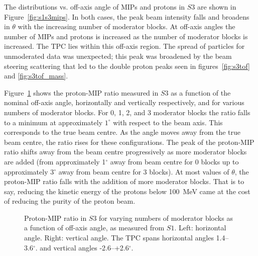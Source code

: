 The distributions vs. off-axis angle of MIPs and protons in $\mathit{S3}$ are shown in Figure~\ref{fig:s1s3mips}.
In both cases, the peak beam intensity falls and broadens in $\theta$ with the increasing number of moderator blocks. 
At off-axis angles the number of MIPs and protons is increased as the number of moderator blocks is increased.
The TPC lies within this off-axis region.
The spread of particles for unmoderated data was unexpected; this peak was broadened by the beam steering scattering that led to the double proton peaks seen in figures~\ref{fig:s3tof} and \ref{fig:s3tof_mass}.


Figure~\ref{fig:propiratio_s3_horz} shows the proton-MIP ratio measured in $\mathit{S3}$ as a function of the nominal off-axis angle, horizontally and vertically respectively, and for various numbers of moderator blocks.
For 0, 1, 2, and 3 moderator blocks the ratio falls to a minimum at approximately $1^{\circ}$ with respect to the beam axis.
This corresponds to the true beam centre.
As the angle moves away from the true beam centre, the ratio rises for these configurations.
The peak of the proton-MIP ratio shifts away from the beam centre progressively as more moderator blocks are added (from approximately 1$^{\circ}$ away from beam centre for 0 blocks up to approximately 3$^{\circ}$ away from beam centre for 3 blocks).
At most values of $\theta$, the proton-MIP ratio falls with the addition of more moderator blocks. 
That is to say, reducing the kinetic energy of the protons below 100~MeV came at the cost of reducing the purity of the proton beam.

\begin{figure}[!ht]
  \begin{minipage}[t]{0.48\textwidth}
    \begin{adjustbox}{max totalsize={\textwidth}{.35\textheight}, center}
      
    \end{adjustbox}
    
  \end{minipage}
  \hspace{0.3cm}
  \begin{minipage}[t]{0.48\textwidth}
    \begin{adjustbox}{max totalsize={\textwidth}{.35\textheight}, center}
      
    \end{adjustbox}
  \end{minipage}	
  \caption{\label{fig:propiratio_s3_horz}Proton-MIP ratio in $\mathit{S3}$ for varying numbers of moderator blocks as a function of off-axis angle, as measured from $\mathit{S1}$.  Left: horizontal angle. Right: vertical angle. The TPC spans horizontal angles 1.4--3.6$^{ \circ }$. and vertical angles -2.6--+2.6$^{ \circ }$.}
\end{figure}

